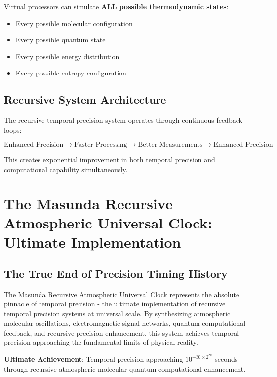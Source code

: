 \documentclass[12pt,a4paper]{article}
\begin{document}
Virtual processors can simulate \textbf{ALL possible thermodynamic states}:
\begin{itemize}
\item Every possible molecular configuration
\item Every possible quantum state
\item Every possible energy distribution
\item Every possible entropy configuration
\end{itemize}

\subsection{Recursive System Architecture}

The recursive temporal precision system operates through continuous feedback loops:

\begin{equation}
\text{Enhanced Precision} \rightarrow \text{Faster Processing} \rightarrow \text{Better Measurements} \rightarrow \text{Enhanced Precision}
\end{equation}

This creates exponential improvement in both temporal precision and computational capability simultaneously.

\section{The Masunda Recursive Atmospheric Universal Clock: Ultimate Implementation}

\subsection{The True End of Precision Timing History}

The Masunda Recursive Atmospheric Universal Clock represents the absolute pinnacle of temporal precision - the ultimate implementation of recursive temporal precision systems at universal scale. By synthesizing atmospheric molecular oscillations, electromagnetic signal networks, quantum computational feedback, and recursive precision enhancement, this system achieves temporal precision approaching the fundamental limits of physical reality.

\textbf{Ultimate Achievement}: Temporal precision approaching $10^{-30 \times 2^{\infty}}$ seconds through recursive atmospheric molecular quantum computational enhancement.
\end{document}
